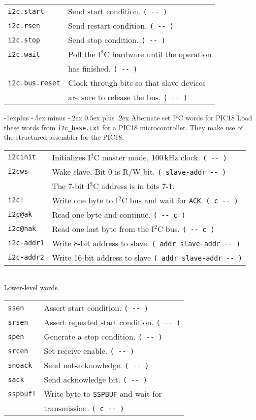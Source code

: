 \documentclass[10pt,landscape,a4paper]{article}
\makeatletter
\renewcommand{\subsection}{\@startsection{subsection}{2}{0mm}%
                                {-1explus -.5ex minus -.2ex}%
                                {0.5ex plus .2ex}%
                                {\normalfont\normalsize\bfseries}}
\makeatother
\begin{document}
\begin{multicols}{3}
\begin{tabular}{@{}ll@{}}
\verb!i2c.start!  &  Send start condition. \verb!( -- )! \\ 
\verb!i2c.rsen!  & Send restart condition. \verb!( -- )! \\ 
\verb!i2c.stop!  & Send stop condition. \verb!( -- )! \\ 
\verb!i2c.wait!  & Poll the I$^2$C hardware until the operation \\
                 & has finished. \verb!( -- )! \\ 
\verb!i2c.bus.reset!  & Clock through bits so that slave devices \\
                      & are sure to release the bus. \verb!( -- )! \\ 
\end{tabular}

\medskip

\subsection{Alternate set I$^2$C words for PIC18}
Load these words from \verb!i2c_base.txt! for a PIC18 microcontroller.
They make use of the structured assembler for the PIC18.
\begin{tabular}{@{}ll@{}}
\verb!i2cinit!  & Initializes I$^2$C master mode, 100\,kHz clock. \verb!( -- ) !\\ 
\verb!i2cws! & Wake slave. Bit 0 is R/W bit. \verb!( slave-addr -- )! \\
             & The 7-bit I$^2$C address is in bits 7-1. \\
\verb?i2c!? & Write one byte to I$^2$C bus and wait for \verb!ACK!. \verb!( c -- )! \\
\verb!i2c@ak! & Read one byte and continue. \verb!( -- c )! \\
\verb!i2c@nak! & Read one last byte from the I$^2$C bus. \verb!( -- c )! \\
\verb!i2c-addr1! & Write 8-bit address to slave. \verb!( addr slave-addr -- )! \\
\verb!i2c-addr2! & Write 16-bit address to slave \verb!( addr slave-addr -- )! \\
\end{tabular}\\
Lower-level words.\\
\begin{tabular}{@{}ll@{}}
\verb!ssen! & Assert start condition. \verb!( -- )! \\
\verb!srsen! & Assert repeated start condition. \verb!( -- )! \\
\verb!spen! & Generate a stop condition. \verb!( -- )! \\
\verb!srcen! & Set receive enable. \verb!( -- )! \\
\verb!snoack! & Send not-acknowledge. \verb!( -- )! \\
\verb!sack! & Send acknowledge bit. \verb!( -- )! \\
\verb?sspbuf!? & Write byte to \verb!SSPBUF! and wait for \\
               & transmission. \verb!( c -- )! \\
\end{tabular}


\end{multicols}
\end{document}
